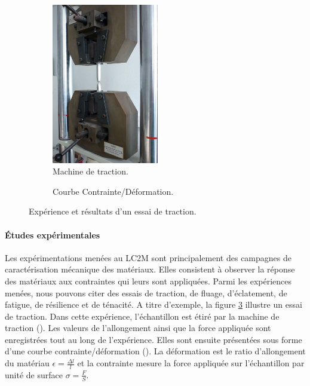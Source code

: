 \documentclass[11pt,class=article,float=false,crop=false]{standalone}
\begin{document}
\begin{figure}[H]
	\centering
	\begin{subfigure}[b]{0.33\textwidth}
		\centering
		\includegraphics[height=7cm]{img/essai-traction.jpg}
		\caption{Machine de traction.}
		\label{fig:exp_lc2m:machine}
	\end{subfigure}	
	\begin{subfigure}[b]{0.66\textwidth}
		\centering
		
		\caption{Courbe Contrainte/Déformation.}
		\label{fig:exp_lc2m:courbe}
	\end{subfigure}
	\caption{Expérience et résultats d'un essai de traction.}
	\label{fig:exp_lc2m}
\end{figure}

\paragraph{Études expérimentales}
Les expérimentations menées au LC2M sont principalement des campagnes de caractérisation mécanique des matériaux. Elles consistent à observer la réponse des matériaux aux contraintes qui leurs sont appliquées. Parmi les expériences menées, nous pouvons citer des essais de traction, de fluage, d'éclatement, de fatigue, de résilience et de ténacité. A titre d'exemple, la figure \ref{fig:exp_lc2m} illustre un essai de traction. Dans cette expérience, l'échantillon est étiré par la machine de traction (). Les valeurs de l'allongement ainsi que la force appliquée sont enregistrées tout au long de l'expérience. Elles sont ensuite présentées sous forme d'une courbe contrainte/déformation (). La déformation est le ratio d'allongement du matériau $\epsilon = \frac{\Delta l}{l}$ et la contrainte mesure la force appliquée sur l'échantillon par unité de surface $\sigma = \frac{F}{S}$.
\end{document}
